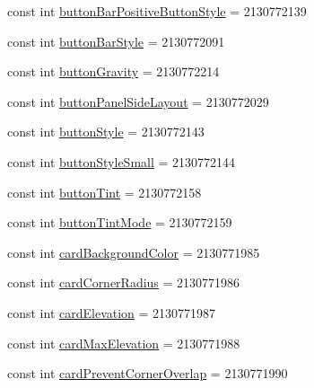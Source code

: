 \begin{DoxyCompactItemize}
\item 
const int \mbox{\hyperlink{class_f_w_p_s___app_1_1_droid_1_1_resource_1_1_attribute_a07ee70f420a6d6d079a350f504b830bf}{button\+Bar\+Positive\+Button\+Style}} = 2130772139
\item 
const int \mbox{\hyperlink{class_f_w_p_s___app_1_1_droid_1_1_resource_1_1_attribute_ad5e9627c185b9d64722ac687efb0a0d9}{button\+Bar\+Style}} = 2130772091
\item 
const int \mbox{\hyperlink{class_f_w_p_s___app_1_1_droid_1_1_resource_1_1_attribute_aa38d6da0a5d1eb2e96d3411d60a78b03}{button\+Gravity}} = 2130772214
\item 
const int \mbox{\hyperlink{class_f_w_p_s___app_1_1_droid_1_1_resource_1_1_attribute_a679abcc7e8421edbec3dc64d6b74e99e}{button\+Panel\+Side\+Layout}} = 2130772029
\item 
const int \mbox{\hyperlink{class_f_w_p_s___app_1_1_droid_1_1_resource_1_1_attribute_a7e76ec3414ecfcf6d6458fa8c2e06d06}{button\+Style}} = 2130772143
\item 
const int \mbox{\hyperlink{class_f_w_p_s___app_1_1_droid_1_1_resource_1_1_attribute_ab08aed30b87cfa7cc0cee400be0c4156}{button\+Style\+Small}} = 2130772144
\item 
const int \mbox{\hyperlink{class_f_w_p_s___app_1_1_droid_1_1_resource_1_1_attribute_a9e49cb6f24adcf9b46b8cb1fa29aa486}{button\+Tint}} = 2130772158
\item 
const int \mbox{\hyperlink{class_f_w_p_s___app_1_1_droid_1_1_resource_1_1_attribute_a43777d063c60a2b15d8b06adeeac0fca}{button\+Tint\+Mode}} = 2130772159
\item 
const int \mbox{\hyperlink{class_f_w_p_s___app_1_1_droid_1_1_resource_1_1_attribute_a26e8f7d0fc7f75a2ab1d5c3a9c7b4097}{card\+Background\+Color}} = 2130771985
\item 
const int \mbox{\hyperlink{class_f_w_p_s___app_1_1_droid_1_1_resource_1_1_attribute_ad43a806a0a7681319dada9de501a153b}{card\+Corner\+Radius}} = 2130771986
\item 
const int \mbox{\hyperlink{class_f_w_p_s___app_1_1_droid_1_1_resource_1_1_attribute_ae1b1d394d9acdcaedf101891f6fd1551}{card\+Elevation}} = 2130771987
\item 
const int \mbox{\hyperlink{class_f_w_p_s___app_1_1_droid_1_1_resource_1_1_attribute_af20bbec36c58e8852c636f5fe473ecb9}{card\+Max\+Elevation}} = 2130771988
\item 
const int \mbox{\hyperlink{class_f_w_p_s___app_1_1_droid_1_1_resource_1_1_attribute_a37378b15dc6e805682b35135b3b9cc1f}{card\+Prevent\+Corner\+Overlap}} = 2130771990

\end{DoxyCompactItemize}
